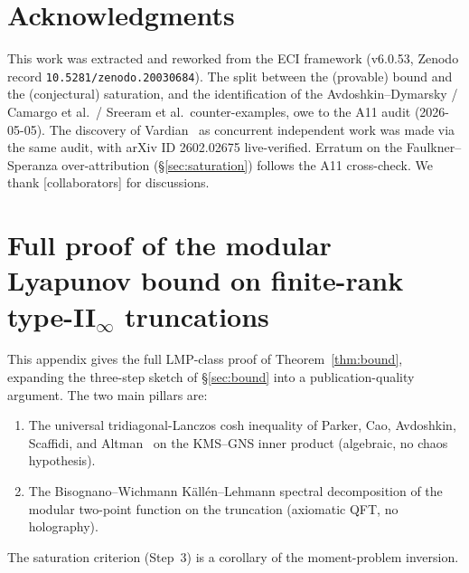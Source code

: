 \documentclass[12pt,a4paper]{article}
\begin{document}
\section*{Acknowledgments}

This work was extracted and reworked from the ECI framework
(v6.0.53, Zenodo record \texttt{10.5281/zenodo.20030684}).
The split between the (provable) bound and the (conjectural)
saturation, and the identification of the Avdoshkin--Dymarsky /
Camargo et al.\ / Sreeram et al.\ counter-examples, owe to the A11
audit (2026-05-05).
The discovery of Vardian~\cite{Vardian2026} as concurrent
independent work was made via the same audit, with arXiv ID
2602.02675 live-verified.
Erratum on the Faulkner--Speranza over-attribution (\S\ref{sec:saturation})
follows the A11 cross-check.
We thank [collaborators] for discussions.


\appendix

\section{Full proof of the modular Lyapunov bound on finite-rank
  type-II$_\infty$ truncations}
\label{app:A61-proof}


This appendix gives the full LMP-class proof of
Theorem~\ref{thm:bound}, expanding the three-step sketch of
\S\ref{sec:bound} into a publication-quality argument.
The two main pillars are:
\begin{enumerate}
\item The universal tridiagonal-Lanczos cosh inequality of Parker,
  Cao, Avdoshkin, Scaffidi, and Altman~\cite{Parker2019} on the
  KMS--GNS inner product (algebraic, no chaos hypothesis).
\item The Bisognano--Wichmann K\"{a}ll\'{e}n--Lehmann spectral
  decomposition of the modular two-point function on the truncation
  (axiomatic QFT, no holography).
\end{enumerate}
The saturation criterion (Step~3) is a corollary of the
moment-problem inversion.
\end{document}
